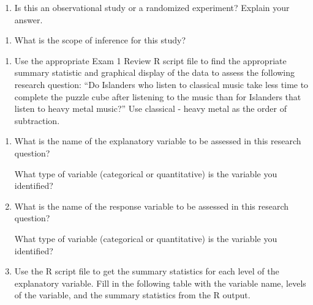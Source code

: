 \documentclass[
]{report}
\providecommand{\tightlist}{%
  \setlength{\itemsep}{0pt}\setlength{\parskip}{0pt}}
\begin{document}
\vspace{0.5in}

\begin{enumerate}
\def\labelenumi{\roman{enumi}.}
\tightlist
\item
  Is this an observational study or a randomized experiment? Explain your answer.
\end{enumerate}

\vspace{0.5in}

\begin{enumerate}
\def\labelenumi{\alph{enumi}.}
\setcounter{enumi}{9}
\tightlist
\item
  What is the scope of inference for this study?
\end{enumerate}

\newpage

\begin{enumerate}
\def\labelenumi{\arabic{enumi}.}
\setcounter{enumi}{5}
\tightlist
\item
  Use the appropriate Exam 1 Review R script file to find the appropriate summary statistic and graphical display of the data to assess the following research question: ``Do Islanders who listen to classical music take less time to complete the puzzle cube after listening to the music than for Islanders that listen to heavy metal music?'' Use classical - heavy metal as the order of subtraction.
\end{enumerate}

\begin{enumerate}
\def\labelenumi{\alph{enumi}.}
\item
  What is the name of the explanatory variable to be assessed in this research question?
  \vspace{0.3in}

  What type of variable (categorical or quantitative) is the variable you identified?
  \vspace{0.3in}
\item
  What is the name of the response variable to be assessed in this research question?
  \vspace{0.3in}

  What type of variable (categorical or quantitative) is the variable you identified?
  \vspace{0.3in}
\item
  Use the R script file to get the summary statistics for each level of the explanatory variable. Fill in the following table with the variable name, levels of the variable, and the summary statistics from the R output.
\end{enumerate}
\end{document}
